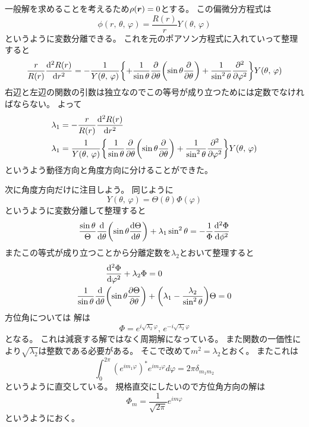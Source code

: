 \documentclass[../master.tex]{subfiles}
\begin{document}
一般解を求めることを考えるため\(\rho(\vb*{r})=0\)とする。
この偏微分方程式は
\begin{equation}
	\phi(r,\,\theta,\,\varphi) = \frac{R(r)}{r}Y(\theta,\,\varphi)
\end{equation}
というように変数分離できる。
これを元のポアソン方程式に入れていって整理すると
\begin{equation}
	\frac{r}{R(r)}\dv[2]{R(r)}{r}
	= -\frac{1}{Y(\theta,\,\varphi)}\qty{
		+\frac{1}{\sin\theta}\pdv{\theta}
		\qty(\sin\theta\pdv{\theta})
		+ \frac{1}{\sin^2\theta}\pdv[2]{\varphi}}Y(\theta,\,\varphi)
\end{equation}
右辺と左辺の関数の引数は独立なのでこの等号が成り立つためには定数でなければならない。
よって
\begin{align}
	\lambda_1 & =-\frac{r}{R(r)}\dv[2]{R(r)}{r} \\
	\lambda_1 & = \frac{1}{Y(\theta,\,\varphi)}
	\qty{
		\frac{1}{\sin\theta}\pdv{\theta}
		\qty(\sin\theta\pdv{\theta})
		+ \frac{1}{\sin^2\theta}\pdv[2]{\varphi}}Y(\theta,\,\varphi)
\end{align}
というよう動径方向と角度方向に分けることができた。

次に角度方向だけに注目しよう。
同じように
\begin{equation}
	Y(\theta,\,\varphi) = \Theta(\theta)\Phi(\varphi)
\end{equation}
というように変数分離して整理すると
\begin{equation}
	\frac{\sin\theta}{\Theta}\dv{\theta}\qty(\sin\theta\dv{\Theta}{\theta}) + \lambda_1 \sin^2\theta
	= -\frac{1}{\Phi}\dv[2]{\Phi}{\phi}
\end{equation}
またこの等式が成り立つことから分離定数を\(\lambda_2\)とおいて整理すると
\begin{align}
	\dv[2]{\Phi}{\varphi} + \lambda_2 \Phi                               & =0                                                       \\
	\frac{1}{\sin\theta}\dv{\theta} \qty(\sin\theta\pdv{\Theta}{\theta}) & + \qty(\lambda_1-\frac{\lambda_2}{\sin^2\theta})\Theta=0
\end{align}
方位角については
解は
\begin{equation}
	\Phi = e^{i\sqrt{\lambda_2}\varphi},\,e^{-i\sqrt{\lambda_2}\varphi}
\end{equation}
となる。
これは減衰する解ではなく周期解になっている。
また関数の一価性により\(\sqrt{\lambda_2}\)は整数である必要がある。
そこで改めて\(m^2 = \lambda_2\)とおく。
またこれは
\begin{equation}
	\int_{0}^{2\pi} (e^{im_1\varphi})^* e^{im_2\varphi} d\varphi = 2\pi\delta_{m_1 m_2}
\end{equation}
というように直交している。
規格直交にしたいので方位角方向の解は
\begin{equation}
	\Phi_m = \frac{1}{\sqrt{2\pi}} e^{im\varphi}
\end{equation}
というようにおく。
\end{document}
